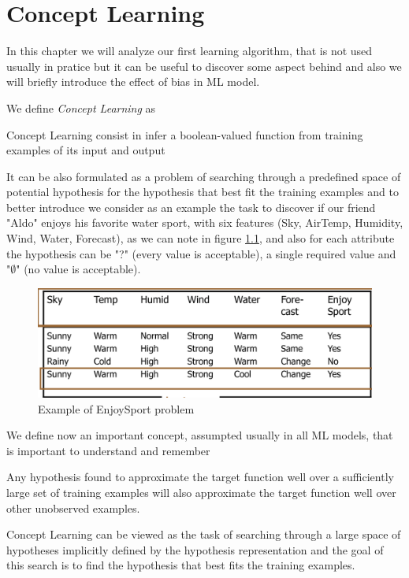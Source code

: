 \chapter{Concept Learning}
In this chapter we will analyze our first learning algorithm, that is not used usually in pratice but it can be useful to discover 
some aspect behind and also we will briefly introduce the effect of bias in ML model.

We define \emph{Concept Learning} as 
\begin{defi}
    Concept Learning consist in infer a boolean-valued function from training examples of its input and output
\end{defi}
It can be also formulated as a problem of searching through a predefined space of potential hypothesis for the hypothesis that best fit 
the training examples and to better introduce we consider as an example the task to discover if our friend "Aldo" enjoys his favorite water sport,
with six features (Sky, AirTemp, Humidity, Wind, Water, Forecast), as we can note in figure \ref{img:conceptExample}, and also for each attribute
the hypothesis can be "?" (every value is acceptable), a single required value and "$\emptyset$" (no value is acceptable).

\begin{figure}
    \caption{Example of EnjoySport problem}
    \label{img:conceptExample}
    \includegraphics[width=\textwidth]{Images/enjoySport}
\end{figure}
We define now an important concept, assumpted usually in all ML models, that is important to understand and remember
\begin{defi}
    Any hypothesis found to approximate  the target function well over a sufficiently large set of training examples will also approximate the 
    target function well over other unobserved examples.
\end{defi}
Concept Learning can be viewed as the task of searching through a large space of hypotheses implicitly defined by the hypothesis representation and 
the goal of this search is to find the hypothesis that best fits the training examples.

